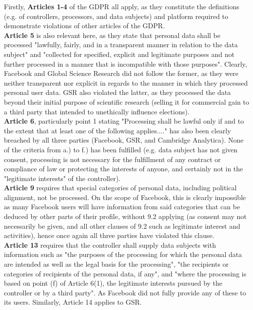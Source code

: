 \documentclass[a4wide, 10pt]{article}
\begin{document}
Firstly, \textbf{Articles 1-4} of the GDPR all apply, as they constitute the definitions (e.g. of controllers, processors, and data subjects) and platform required to demonstrate violations of other articles of the GDPR.
\vspace{1ex}\\
\textbf{Article 5} is also relevant here, as they state that personal data shall be processed "lawfully, fairly, and in a transparent manner in relation to the data subject" and "collected for specified, explicit and legitimate purposes and not further processed in a manner that is incompatible with those purposes". Clearly, Facebook and Global Science Research did not follow the former, as they were neither transparent nor explicit in regards to the manner in which they processed personal user data. GSR also violated the latter, as they processed the data beyond their initial purpose of scientific research (selling it for commercial gain to a third party that intended to unethically influence elections).
\vspace{1ex} \\
\textbf{Article 6}, particularly point 1 stating "Processing shall be lawful only if and to the extent that at least one of the following applies...." has also been clearly breached by all three parties (Facebook, GSR, and Cambridge Analytica). None of the criteria from a.) to f.) has been fulfilled (e.g. data subject has not given consent, processing is not necessary for the fulfillment of any contract or compliance of law or protecting the interests of anyone, and certainly not in the "legitimate interests" of the controller).
\vspace{1ex} \\
\textbf{Article 9} requires that special categories of personal data, including political alignment, not be processed. On the scope of Facebook, this is clearly impossible as many Facebook users will have information from said categories that can be deduced by other parts of their profile, without 9.2 applying (as consent may not necessarily be given, and all other clauses of 9.2 such as legitimate interest and activities), hence once again all three parties have violated this clause.
\vspace{1ex} \\
\textbf{Article 13} requires that the controller shall supply data subjects with information such as "the purposes of the processing for which the personal data are intended as well as the legal basis for the processing", "the recipients or categories of recipients of the personal data, if any", and "where the processing is based on point (f) of Article 6(1), the legitimate interests pursued by the controller or by a third party". As Facebook did not fully provide any of these to its users. Similarly, Article 14 applies to GSR.
\end{document}
